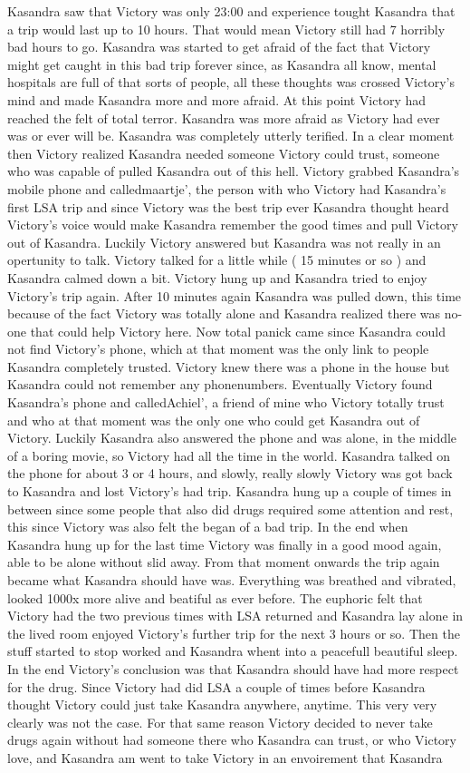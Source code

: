 \documentclass[12pt]{book}
\begin{document}
Kasandra saw that Victory was only 23:00 and experience tought Kasandra that a trip would last up to 10 hours. That would mean Victory still had 7 horribly bad hours to go. Kasandra was started to get afraid of the fact that Victory might get caught in this bad trip forever since, as Kasandra all know, mental hospitals are full of that sorts of people, all these thoughts was crossed Victory's mind and made Kasandra more and more afraid. At this point Victory had reached the felt of total terror. Kasandra was more afraid as Victory had ever was or ever will be. Kasandra was completely utterly terified. In a clear moment then Victory realized Kasandra needed someone Victory could trust, someone who was capable of pulled Kasandra out of this hell. Victory grabbed Kasandra's mobile phone and calledmaartje', the person with who Victory had Kasandra's first LSA trip and since Victory was the best trip ever Kasandra thought heard Victory's voice would make Kasandra remember the good times and pull Victory out of Kasandra. Luckily Victory answered but Kasandra was not really in an opertunity to talk. Victory talked for a little while ( 15 minutes or so ) and Kasandra calmed down a bit. Victory hung up and Kasandra tried to enjoy Victory's trip again. After 10 minutes again Kasandra was pulled down, this time because of the fact Victory was totally alone and Kasandra realized there was no-one that could help Victory here. Now total panick came since Kasandra could not find Victory's phone, which at that moment was the only link to people Kasandra completely trusted. Victory knew there was a phone in the house but Kasandra could not remember any phonenumbers. Eventually Victory found Kasandra's phone and calledAchiel', a friend of mine who Victory totally trust and who at that moment was the only one who could get Kasandra out of Victory. Luckily Kasandra also answered the phone and was alone, in the middle of a boring movie, so Victory had all the time in the world. Kasandra talked on the phone for about 3 or 4 hours, and slowly, really slowly Victory was got back to Kasandra and lost Victory's had trip. Kasandra hung up a couple of times in between since some people that also did drugs required some attention and rest, this since Victory was also felt the began of a bad trip. In the end when Kasandra hung up for the last time Victory was finally in a good mood again, able to be alone without slid away. From that moment onwards the trip again became what Kasandra should have was. Everything was breathed and vibrated, looked 1000x more alive and beatiful as ever before. The euphoric felt that Victory had the two previous times with LSA returned and Kasandra lay alone in the lived room enjoyed Victory's further trip for the next 3 hours or so. Then the stuff started to stop worked and Kasandra whent into a peacefull beautiful sleep. In the end Victory's conclusion was that Kasandra should have had more respect for the drug. Since Victory had did LSA a couple of times before Kasandra thought Victory could just take Kasandra anywhere, anytime. This very very clearly was not the case. For that same reason Victory decided to never take drugs again without had someone there who Kasandra can trust, or who Victory love, and Kasandra am went to take Victory in an envoirement that Kasandra 
\end{document}
